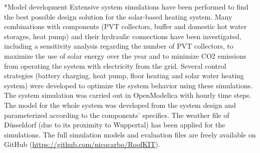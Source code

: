 \documentclass[twocolumn, a4paper,10pt]{article}
\makeatletter
\renewcommand\section{\@startsection{section}{1}{\z@}{3pt}{3pt}{\normalfont\large\bfseries}}
\makeatother
\begin{document}
\section*{Model development}
Extensive system simulations have been performed to find the best possible design solution for the solar-based heating system. Many combinations with components (PVT collectors, buffer and domestic hot water storages, heat pump) and their hydraulic connections have been investigated, including a sensitivity analysis regarding the number of PVT collectors, to maximize the use of solar energy over the year and to minimize CO2 emissions from operating the system with electricity from the grid. Several control strategies (battery charging, heat pump, floor heating and solar water heating system) were developed to optimize the system behavior using these simulations. The system simulation was carried out in OpenModelica \citet{Fritzson2006} with hourly time steps. The model for the whole system was developed from the system design and parameterized according to the components' specifics. The weather file of Düsseldorf (due to its proximity to Wuppertal) has been applied for the simulations. The full simulation models and evaluation files are freely available on GitHub (\textcolor{blue}{\url{https://github.com/nicocarbo/RoofKIT}}).\\

\end{document}
